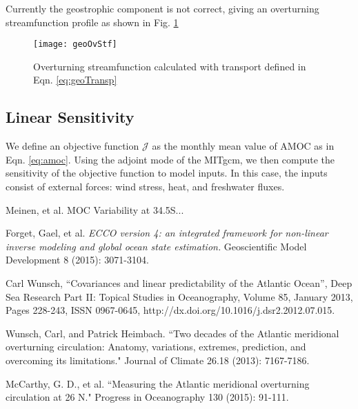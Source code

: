 \documentclass[a4paper,11pt]{article}
\begin{document}
    Currently the geostrophic component is not correct, giving an overturning streamfunction profile as shown in Fig. \ref{fig:geoOvStf}
    
    \begin{figure}
    \centering
    \texttt{[image: geoOvStf]}
    \caption{Overturning streamfunction calculated with transport defined in Eqn. \ref{eq:geoTransp}}
    \label{fig:geoOvStf}
   \end{figure}

   
  \subsection{Linear Sensitivity}
  \label{linearSensitivity}
  
  We define an objective function $\mathcal{J}$ as the monthly mean value of AMOC as in Eqn. \ref{eq:amoc}. Using the adjoint mode of the MITgcm, we then compute the sensitivity of the objective function to model inputs. In this case, the inputs consist of external forces: wind stress, heat, and freshwater fluxes. 
  

\begin{thebibliography}{3}

  Meinen, et al. MOC Variability at 34.5S...
  
  Forget, Gael, et al. \textit{ECCO version 4: an integrated framework for non-linear inverse modeling and global ocean state estimation.} Geoscientific Model Development 8 (2015): 3071-3104.
  
  Carl Wunsch, ``Covariances and linear predictability of the Atlantic Ocean'', Deep Sea Research Part II: Topical Studies in Oceanography, Volume 85, January 2013, Pages 228-243, ISSN 0967-0645, http://dx.doi.org/10.1016/j.dsr2.2012.07.015.
  
  Wunsch, Carl, and Patrick Heimbach. ``Two decades of the Atlantic meridional overturning circulation: Anatomy, variations, extremes, prediction, and overcoming its limitations." Journal of Climate 26.18 (2013): 7167-7186.
  
  McCarthy, G. D., et al. ``Measuring the Atlantic meridional overturning circulation at 26 N." Progress in Oceanography 130 (2015): 91-111.

\end{thebibliography}
\end{document}

